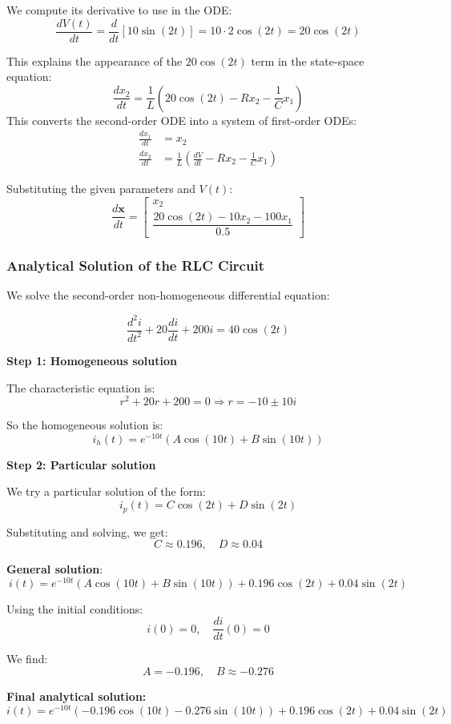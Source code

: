 \documentclass[a4paper,12pt]{article}
\begin{document}
	We compute its derivative to use in the ODE:
	\[
	\frac{dV(t)}{dt} = \frac{d}{dt}[10\sin(2t)] = 10 \cdot 2\cos(2t) = 20\cos(2t)
	\]
	
	This explains the appearance of the $20\cos(2t)$ term in the state-space equation:
	\[
	\frac{dx_2}{dt} = \frac{1}{L}\left(20\cos(2t) - Rx_2 - \frac{1}{C}x_1\right)
	\]
	This converts the second-order ODE into a system of first-order ODEs:
	\begin{align*}
		\frac{dx_1}{dt} &= x_2 \\
		\frac{dx_2}{dt} &= \frac{1}{L}\left(\frac{dV}{dt} - Rx_2 - \frac{1}{C}x_1\right)
	\end{align*}
	
	Substituting the given parameters and $V(t)$:
	\[
	\frac{d\mathbf{x}}{dt} = \begin{bmatrix} x_2 \\ \dfrac{20\cos(2t) - 10x_2 - 100x_1}{0.5} \end{bmatrix}
	\]
	

	\subsubsection*{Analytical Solution of the RLC Circuit}
	
	We solve the second-order non-homogeneous differential equation:
	
	\[
	\frac{d^2 i}{dt^2} + 20 \frac{di}{dt} + 200i = 40\cos(2t)
	\]
	
	\textbf{Step 1: Homogeneous solution}
	
	The characteristic equation is:
	\[
	r^2 + 20r + 200 = 0 \Rightarrow r = -10 \pm 10i
	\]
	
	So the homogeneous solution is:
	\[
	i_h(t) = e^{-10t}(A \cos(10t) + B \sin(10t))
	\]
	
	\textbf{Step 2: Particular solution}
	
	We try a particular solution of the form:
	\[
	i_p(t) = C \cos(2t) + D \sin(2t)
	\]
	
	Substituting and solving, we get:
	\[
	C \approx 0.196, \quad D \approx 0.04
	\]
	
	\textbf{General solution}:
	\[
	i(t) = e^{-10t}(A \cos(10t) + B \sin(10t)) + 0.196 \cos(2t) + 0.04 \sin(2t)
	\]
	
	Using the initial conditions:
	\[
	i(0) = 0, \quad \frac{di}{dt}(0) = 0
	\]
	
	We find:
	\[
	A = -0.196, \quad B \approx -0.276
	\]
	
	\textbf{Final analytical solution:}
	\[
	i(t) = e^{-10t}(-0.196 \cos(10t) - 0.276 \sin(10t)) + 0.196 \cos(2t) + 0.04 \sin(2t)
	\]
	
\end{document}
